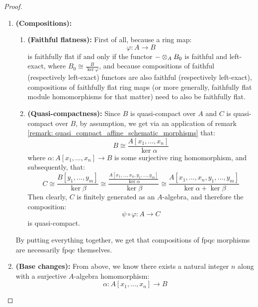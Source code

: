                         \begin{proof}
                            \noindent
                            \begin{enumerate}
                                \item \textbf{(Compositions):}  
                                    \begin{enumerate}
                                        \item \textbf{(Faithful flatness):} First of all, because a ring map:
                                            $$\varphi: A \to B$$
                                        is faithfully flat if and only if the functor $- \tensor_A B_0$ is faithful and left-exact, where $B_0 \cong \frac{B}{\ker \varphi}$, and because compositions of faithful (respectively left-exact) functors are also faithful (respectively left-exact), compositions of faithfully flat ring maps (or more generally, faithfully flat module homomorphisms for that matter) need to also be faithfully flat.
                                        \item \textbf{(Quasi-compactness):} Since $B$ is quasi-compact over $A$ and $C$ is quasi-compact over $B$, by assumption, we get via an application of remark \ref{remark: quasi_compact_affine_schematic_morphisms} that:
                                            $$B \cong \frac{A[x_1, ..., x_n]}{\ker \alpha}$$
                                        where $\alpha: A[x_1, ..., x_n] \to B$ is some surjective ring homomorphism, and subsequently, that:
                                            $$C \cong \frac{B[y_1, ..., y_m]}{\ker \beta} \cong \frac{\frac{A[x_1, ..., x_n, y_1, ..., y_m]}{\ker \alpha}}{\ker \beta} \cong \frac{A[x_1, ..., x_n, y_1, ..., y_m]}{\ker \alpha + \ker \beta}$$
                                        Then clearly, $C$ is finitely generated as an $A$-algebra, and therefore the composition:
                                            $$\psi \circ \varphi: A \to C$$
                                        is quasi-compact.
                                    \end{enumerate}
                                By putting everything together, we get that compositions of fpqc morphisms are necessarily fpqc themselves.
                                \item \textbf{(Base changes):} From above, we know there exists a natural integer $n$ along with a surjective $A$-algebra homomorphism:
                                    $$\alpha: A[x_1, ..., x_n] \to B$$

\end{enumerate}
\end{proof}
